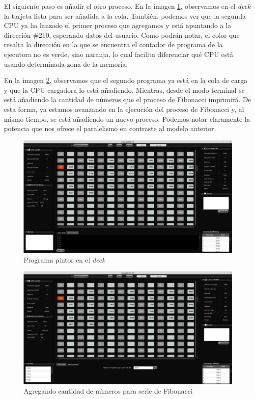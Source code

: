 \documentclass[letterpaper,12pt,oneside]{book}
\begin{document}
			
		\newpage
			El siguiente paso es añadir el otro proceso. En la imagen \ref{fig:vm_add_pintor_deck}, observamos en el \textit{deck} la
			tarjeta lista para ser añadida a la cola. También, podemos ver que la segunda CPU ya ha lanzado el primer proceso que agregamos
			y está apuntando a la dirección \#210, esperando datos del usuario. Como podrán notar, el color que resalta la dirección en la
			que se encuentra el contador de programa de la ejecutora no es verde, sino naranja, lo cual facilita diferenciar 
			qué CPU está usando determinada zona de la memoria.
		 	
			
		\newpage
			En la imagen \ref{fig:vm_fibonacci_putting_numer_of_digits}, observamos que el segundo programa ya está en la cola de carga
			y que la CPU cargadora lo está añadiendo. Mientras, desde el modo terminal 
			se está añadiendo la cantidad de números que
			el proceso de Fibonacci imprimirá. De esta forma, ya estamos avanzando en la ejecución del proceso de Fibonacci
			y, al mismo tiempo, se está añadiendo un nuevo proceso. Podemos notar claramente la potencia
			que nos ofrece el paralelismo en contraste al modelo anterior.
			
			\begin{figure}[H]		
				\centering
				\includegraphics[scale=0.26]{media/Paralela/vm_add_pintor_deck.png}
				\caption{Programa pintor en el \textit{deck}} 
				\label{fig:vm_add_pintor_deck}
			\end{figure}
			
			\begin{figure}[h]		
				\centering
				\includegraphics[scale=0.26]{media/Paralela/vm_fibonacci_putting_numer_of_digits.png}
				\caption{Agregando cantidad de números para serie de Fibonacci}
				\label{fig:vm_fibonacci_putting_numer_of_digits}
			\end{figure}
			
\end{document}
